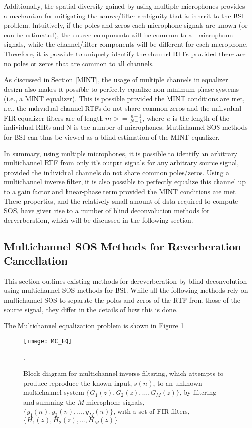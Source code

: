 Additionally, the spatial diversity gained by using multiple microphones provides a mechanism for mitigating the source/filter ambiguity that is inherit to the BSI problem. Intuitively, if the poles and zeros each microphone signals are known (or can be estimated), the source components will be common to all microphone signals, while the channel/filter components will be different for each microphone. Therefore, it is possible to uniquely identify the channel RTFs provided there are no poles or zeros that are common to all channels.

As discussed in Section \ref{MINT}, the usage of multiple channels in equalizer design also makes it possible to perfectly equalize non-minimum phase systems (i.e., a MINT equalizer). This is possible provided the MINT conditions are met, i.e., the individual channel RTFs do not share common zeros and the individual FIR equalizer filters are of length $m >= \frac{n-1}{N-1}$, where $n$ is the length of the individual RIRs and N is the number of microphones. Mutlichannel SOS methods for BSI can thus be viewed as a blind estimation of the MINT equalizer.

In summary, using multiple microphones, it is possible to identify an arbitrary multichannel RTF from only it's output signals for any arbitrary source signal, provided the individual channels do not share common poles/zeros. Using a multichannel inverse filter, it is also possible to perfectly equalize this channel up to a gain factor and linear-phase term provided the MINT conditions are met. These properties, and the relatively small amount of data required to compute SOS, have given rise to a number of blind deconvolution methods for derverberation, which will be discussed in the following section.

\subsection{Multichannel SOS Methods for Reverberation Cancellation}

This section outlines existing methods for dereverberation by blind deconvolution using multichannel SOS methods for BSI. While all the following methods rely on multichannel SOS to separate the poles and zeros of the RTF from those of the source signal, they differ in the details of how this is done.

The Multichannel equalization problem is shown in Figure \ref{fig:MC_EQ}

\begin{figure}[H]
	\texttt{[image: MC\_EQ]}
	\centering
	\caption{Block diagram for multichannel inverse filtering, which attempts to produce reproduce the known input, $s(n)$, to an unknown multichannel system $\{G_1(z), G_2(z), \dots, G_M(z)\}$, by filtering and summing the $M$ microphone signals, $\{y_1(n), y_2(n), \dots, y_M(n)\}$, with a set of FIR filters, $\{H_1(z), H_2(z), \dots, H_M(z)\}$}.
	\label{fig:MC_EQ}
\end{figure}

